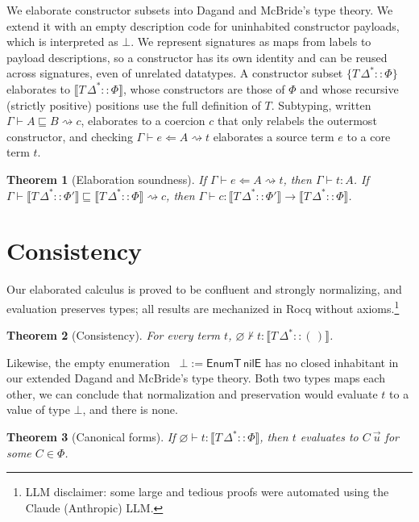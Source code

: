 \documentclass[12pt]{article}
\newtheorem{theorem}{Theorem}
\newcommand{\op}[1]{\mathsf{#1}}
\begin{document}
We elaborate constructor subsets into Dagand and McBride's type theory.
We extend it with an empty description code for uninhabited constructor payloads, which is interpreted as $\bot$.
We represent signatures as maps from labels to payload descriptions, so a constructor has its own identity and can be reused across signatures, even of unrelated datatypes.
A constructor subset $\{T\,\Delta^{*} :: \Phi\}$ elaborates to $\llbracket T\,\Delta^{*} :: \Phi \rrbracket$, whose constructors are those of $\Phi$ and whose recursive (strictly positive) positions use the full definition of $T$.
Subtyping, written $\Gamma \vdash A \sqsubseteq B \rightsquigarrow c$, elaborates to a coercion $c$ that only relabels the outermost constructor, and checking $\Gamma \vdash e \Leftarrow A \rightsquigarrow t$ elaborates a source term $e$ to a core term $t$.

\begin{theorem}[Elaboration soundness]\label{thm:soundness}
If $\Gamma \vdash e \Leftarrow A \rightsquigarrow t$, then $\Gamma \vdash t : A$.\newline
If \mbox{$\Gamma \vdash \llbracket T\,\Delta^{*} :: \Phi' \rrbracket \sqsubseteq \llbracket T\,\Delta^{*} :: \Phi \rrbracket \rightsquigarrow c$}, then \mbox{$\Gamma \vdash c : \llbracket T\,\Delta^{*} :: \Phi' \rrbracket \to \llbracket T\,\Delta^{*} :: \Phi \rrbracket$}.
\end{theorem}

\section{Consistency}
Our elaborated calculus is proved to be confluent and strongly normalizing, and evaluation preserves types; all results are mechanized in Rocq without axioms.\footnote{LLM disclaimer: some large and tedious proofs were automated using the Claude (Anthropic) LLM.}

\begin{theorem}[Consistency]\label{thm:consistency}
For every term $t$, $\varnothing \nvdash t : \llbracket T\,\Delta^{*} :: (\,) \rrbracket$.
\end{theorem}

Likewise, the empty enumeration~\cite[Fig.~2]{dagand2012elaborating} \mbox{$\bot := \op{EnumT}\,\op{nilE}$} has no closed inhabitant in our extended Dagand and McBride's type theory.
Both two types maps each other, we can conclude that normalization and preservation would evaluate $t$ to a value of type $\bot$, and there is none.

\begin{theorem}[Canonical forms]\label{thm:canonical}
If $\varnothing \vdash t : \llbracket T\,\Delta^{*} :: \Phi \rrbracket$, then $t$ evaluates to $C\:\overrightarrow{u}$ for some $C \in \Phi$.
\end{theorem}



\end{document}
